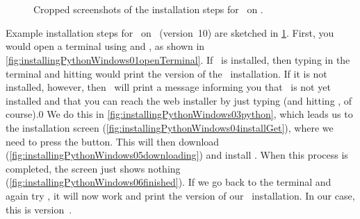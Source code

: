 %
%
\begin{figure}%
\centering%
%
\hfill%
%
%
%
\hfill%
%
%
%
\\[10pt]%
%
%
\hfill%
%
%
%
\\[10pt]%
%
%
%
\hfill%
%
%
%
\caption{Cropped screenshots of the installation steps for \python\ on \windows.}%
\label{fig:installPythonWindows}%
\end{figure}%
%
Example installation steps for \python\ on \windows\ (version~10) are sketched in \cref{fig:installPythonWindows}.
First, you would open a \gls{terminal} using and \windowsTerminal, as shown in \cref{fig:installingPythonWindows01openTerminal}.
If \python\ is installed, then typing  in the terminal and hitting \keys{\return} would print the version of the \python\ installation.
If it is not installed, however, then \windows\ will print a message informing you that \python\ is not yet installed and that you can reach the web installer by just typing  (and hitting \keys{\return}, of course).0
We do this in \cref{fig:installingPythonWindows03python}, which leads us to the installation screen (\cref{fig:installingPythonWindows04installGet}), where we need to press the  button.
This will then download (\cref{fig:installingPythonWindows05downloading}) and install \python.
When this process is completed, the screen just shows nothing (\cref{fig:installingPythonWindows06finished}).
If we go back to the \gls{terminal} and again try , it will now work and print the version of our \python\ installation.
In our case, this is version~.%
%
\endhsection%
%
